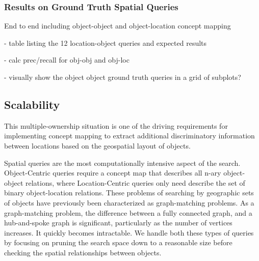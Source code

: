 \subsubsection{Results on Ground Truth Spatial Queries}
End to end including object-object and object-location concept mapping

- table listing the 12 location-object queries and expected results

- calc prec/recall for obj-obj and obj-loc

- visually show the object object ground truth queries in a grid of subplots?




\subsection{Scalability}


This multiple-ownership situation is one of the driving requirements for implementing concept mapping to extract additional discriminatory information between locations based on the geospatial layout of objects.

Spatial queries are the most computationally intensive aspect of the search.
Object-Centric queries require a concept map that describes all n-ary object-object relations, where Location-Centric queries only need describe the set of binary object-location relations.
These problems of searching by geographic sets of objects have previously been characterized as graph-matching problems. 
As a graph-matching problem, the difference between a fully connected graph, and a hub-and-spoke graph is significant, particularly as the number of vertices increases. It quickly becomes intractable. 
We handle both these types of queries by focusing on pruning the search space down to a reasonable size before checking the spatial relationships between objects.

